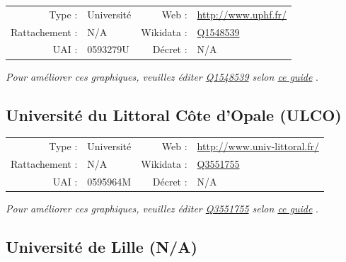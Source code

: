 \documentclass[12pt,french,landscape]{article}
\begin{document}
\begin{tabular*}{0.45\textwidth}{rp{2cm}rl}  
\hline  
Type : & Université & Web : &\href{http://www.uphf.fr/}{http://www.uphf.fr/} \\  
Rattachement : & N/A & Wikidata : & \href{https://www.wikidata.org/entity/Q1548539}{Q1548539} \\  
UAI : & 0593279U & Décret : & N/A \\  
\hline  
\end{tabular*}

\textit{\scriptsize Pour améliorer ces graphiques, veuillez éditer \href{https://www.wikidata.org/entity/Q1548539}{Q1548539}  selon \href{https://github.com/cpesr/wikidataESR/blob/master/Rmd/wikidataESR.md}{ce guide}}
.


\newpage

\hypertarget{universituxe9-du-littoral-cuxf4te-dopale-ulco}{%
\subsection{Université du Littoral Côte d'Opale
(ULCO)}\label{universituxe9-du-littoral-cuxf4te-dopale-ulco}}

\begin{tabular*}{0.45\textwidth}{rp{2cm}rl}  
\hline  
Type : & Université & Web : &\href{http://www.univ-littoral.fr/}{http://www.univ-littoral.fr/} \\  
Rattachement : & N/A & Wikidata : & \href{https://www.wikidata.org/entity/Q3551755}{Q3551755} \\  
UAI : & 0595964M & Décret : & N/A \\  
\hline  
\end{tabular*}

\textit{\scriptsize Pour améliorer ces graphiques, veuillez éditer \href{https://www.wikidata.org/entity/Q3551755}{Q3551755}  selon \href{https://github.com/cpesr/wikidataESR/blob/master/Rmd/wikidataESR.md}{ce guide}}
.


\newpage

\hypertarget{universituxe9-de-lille-na}{%
\subsection{Université de Lille (N/A)}\label{universituxe9-de-lille-na}}
\end{document}
